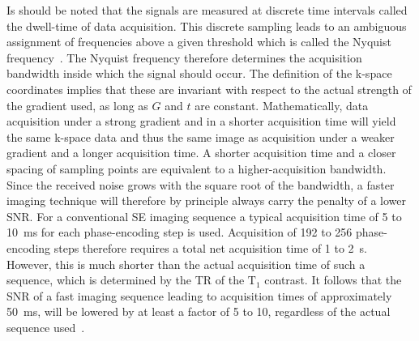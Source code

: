 \noindent Is should be noted that the signals are measured at discrete time intervals called the dwell-time of data acquisition. This discrete sampling leads to an ambiguous assignment of frequencies above a given threshold which is called the Nyquist frequency~\cite{SamplingStrategies}. The Nyquist frequency therefore determines the acquisition bandwidth inside which the signal should occur. The definition of the k-space coordinates implies that these are invariant with respect to the actual strength of the gradient used, as long as $G$ and $t$ are constant. Mathematically, data acquisition under a strong gradient and in a shorter acquisition time will yield the same k-space data and thus the same image as acquisition under a weaker gradient and a longer acquisition time. A shorter acquisition time and a closer spacing of sampling points are equivalent to a higher-acquisition bandwidth. Since the received noise grows with the square root of the bandwidth, a faster imaging technique will therefore by principle always carry the penalty of a lower SNR. For a conventional SE imaging sequence a typical acquisition time of 5 to 10~ms for each phase-encoding step is used. Acquisition of 192 to 256 phase-encoding steps therefore requires a total net acquisition time of 1 to 2~s. However, this is much shorter than the actual acquisition time of such a sequence, which is determined by the TR of the $\text{T}_1$ contrast. It follows that the SNR of a fast imaging sequence leading to acquisition times of approximately 50~ms, will be lowered by at least a factor of 5 to 10, regardless of the actual sequence used~\cite{SamplingStrategies}.\\
